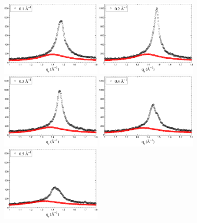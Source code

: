 \begin{figure}[htbp]
  \centering
  \includegraphics[width=0.45\textwidth]{figures/ripple/NGIWAXS/qr_fluid&ripple0}
  \includegraphics[width=0.45\textwidth]{figures/ripple/NGIWAXS/qr_fluid&ripple1}
  \includegraphics[width=0.45\textwidth]{figures/ripple/NGIWAXS/qr_fluid&ripple2}
  \includegraphics[width=0.45\textwidth]{figures/ripple/NGIWAXS/qr_fluid&ripple3}
  \includegraphics[width=0.45\textwidth]{figures/ripple/NGIWAXS/qr_fluid&ripple4}

\end{figure}
